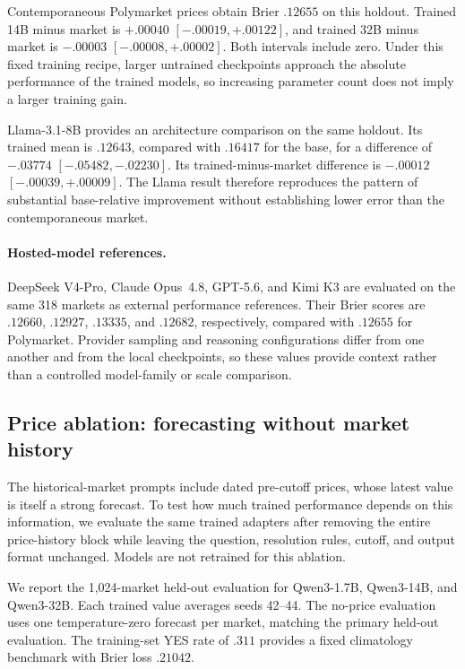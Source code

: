 Contemporaneous Polymarket prices obtain Brier $.12655$ on this holdout.
Trained 14B minus market is \(+.00040\) \( [-.00019,+.00122] \), and trained 32B minus market is \(-.00003\) \( [-.00008,+.00002] \).
Both intervals include zero.
Under this fixed training recipe, larger untrained checkpoints approach the absolute performance of the trained models, so increasing parameter count does not imply a larger training gain.

Llama-3.1-8B provides an architecture comparison on the same holdout.
Its trained mean is $.12643$, compared with $.16417$ for the base, for a difference of \(-.03774\) \( [-.05482,-.02230] \).
Its trained-minus-market difference is \(-.00012\) \( [-.00039,+.00009] \).
The Llama result therefore reproduces the pattern of substantial base-relative improvement without establishing lower error than the contemporaneous market.

\paragraph{Hosted-model references.}

DeepSeek V4-Pro, Claude Opus~4.8, GPT-5.6, and Kimi K3 are evaluated on the same 318 markets as external performance references.
Their Brier scores are $.12660$, $.12927$, $.13335$, and $.12682$, respectively, compared with $.12655$ for Polymarket.
Provider sampling and reasoning configurations differ from one another and from the local checkpoints, so these values provide context rather than a controlled model-family or scale comparison.

\subsection{Price ablation: forecasting without market history}
\label{app:exp4-price-ablation}

The historical-market prompts include dated pre-cutoff prices, whose latest value is itself a strong forecast.
To test how much trained performance depends on this information, we evaluate the same trained adapters after removing the entire price-history block while leaving the question, resolution rules, cutoff, and output format unchanged.
Models are not retrained for this ablation.

We report the 1,024-market held-out evaluation for Qwen3-1.7B, Qwen3-14B, and Qwen3-32B.
Each trained value averages seeds 42--44.
The no-price evaluation uses one temperature-zero forecast per market, matching the primary held-out evaluation.
The training-set YES rate of $.311$ provides a fixed climatology benchmark with Brier loss $.21042$.

